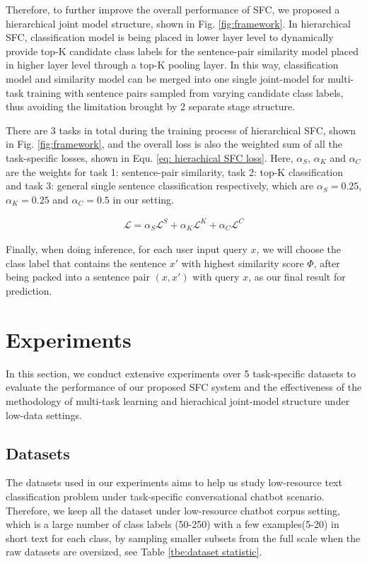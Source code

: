 \documentclass[letterpaper]{article} %
\begin{document}
  Therefore,  to  further  improve the overall performance of SFC, we proposed a
  hierarchical  joint  model  structure,  shown  in Fig. \ref{fig:framework}. In
  hierarchical SFC, classification model is being placed in lower layer level to
  dynamically  provide  top-K  candidate  class  labels  for  the  sentence-pair
  similarity  model  placed in higher layer level through a top-K pooling layer.
  In  this way, classification model and similarity model can be merged into one
  single  joint-model  for  multi-task training with sentence pairs sampled from
  varying  candidate  class  labels,  thus  avoiding the limitation brought by 2
  separate stage structure.

  There  are  3  tasks in total during the training process of hierarchical SFC,
  shown  in  Fig. \ref{fig:framework}, and the overall loss is also the weighted
  sum  of  all  the task-specific losses, shown in Equ. \ref{eq: hierachical SFC
  loss}. Here, $\alpha_S$, $\alpha_K$ and $\alpha_C$ are the weights for task 1:
  sentence-pair  similarity,  task  2:  top-K classification and task 3: general
  single   sentence  classification  respectively,  which  are  $\alpha_S=0.25$,
  $\alpha_K=0.25$ and $\alpha_C=0.5$ in our setting.

  \begin{align}
    \mathcal{L} = \alpha_S \mathcal{L}^S + \alpha_K \mathcal{L}^K + \alpha_C \mathcal{L}^C
    \label{eq: hierachical SFC loss}
  \end{align}

  Finally,  when  doing inference, for each user input query $x$, we will choose
  the  class label that contains the sentence $x'$ with highest similarity score
  $\varPhi$,  after  being packed into a sentence pair $(x, x')$ with query $x$,
  as our final result for prediction.

  \section{Experiments}
  In  this  section,  we  conduct  extensive  experiments  over  5 task-specific
  datasets  to  evaluate  the  performance  of  our  proposed SFC system and the
  effectiveness  of  the  methodology  of  multi-task  learning  and hierachical
  joint-model structure under low-data settings.

  \subsection{Datasets}
  The  datasets  used in our experiments aims to help us study low-resource text
  classification  problem  under  task-specific conversational chatbot scenario.
  Therefore,  we keep all the dataset under low-resource chatbot corpus setting,
  which  is a large number of class labels (50-250) with a few examples(5-20) in
  short  text  for  each  class, by sampling smaller subsets from the full scale
  when the raw datasets are oversized, see Table \ref{tbe:dataset statistic}.
\end{document}
